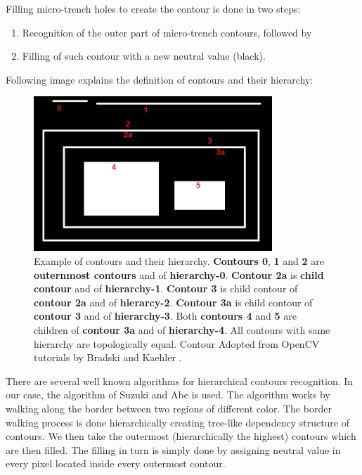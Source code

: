 \documentclass[pdftex,12pt,a4paper]{report}
\begin{document}
Filling micro-trench holes to create the contour is done in two steps:

\begin{enumerate}
\item Recognition of the outer part of micro-trench contours, followed by
\item Filling of such contour with a new neutral value (black).
\end{enumerate}

Following image explains the definition of contours and their hierarchy:

\begin{figure}[H]
\centering
\includegraphics[width=0.8\textwidth]{images/contours}
\caption[Example of image contours]{Example of contours and their hierarchy. \textbf{Contours 0}, \textbf{1} and \textbf{2} are \textbf{outernmost contours} and of \textbf{hierarchy-0}. \textbf{Contour 2a} is \textbf{child contour} and of \textbf{hierarchy-1}. \textbf{Contour 3} is child contour of \textbf{contour 2a} and of \textbf{hierarcy-2}. \textbf{Contour 3a} is child contour of  \textbf{contour 3} and of \textbf{hierarchy-3}. Both \textbf{contours 4} and \textbf{5} are children of \textbf{contour 3a} and of \textbf{hierarchy-4}. All contours with same hierarchy are topologically equal. Contour Adopted from OpenCV tutorials by Bradski and Kaehler \cite{bradski2008learning}.}
\label{fig:contours}
\end{figure}

There are several well known algorithms for hierarchical contours recognition. In our case, the algorithm of Suzuki and Abe \cite{suzuki1985topological} is used. The algorithm works by walking along the border between two regions of different color. The border walking process is done hierarchically creating tree-like dependency structure of contours. We then take the outermost (hierarchically the highest) contours which are then filled. The filling in turn is simply done by assigning neutral value in every pixel located inside every outermost contour.
\end{document}

